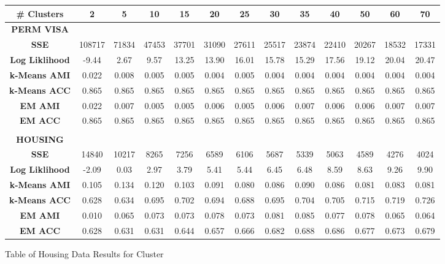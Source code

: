 \documentclass[h]{article}
\begin{document}
\begin{figure}[H] 
\begin{tabular}{ | c | c  | c | c | c | c | c | c| c| c| c| c| c | } 
\hline
\textbf{ # Clusters } & \textbf{2} & \textbf{5} & \textbf{10} & \textbf{15} & \textbf{20} & \textbf{25} & \textbf{30} & \textbf{35} & \textbf{40} & \textbf{50} & \textbf{60} & \textbf{70}   \\
\hline
\textbf{PERM VISA} \\ \hline
\textbf{SSE} &  108717 & 71834 & 47453 & 37701 & 31090 & 27611 & 25517 & 23874 & 22410 & 20267 & 18532 & 17331 \\ \hline
\textbf{Log Liklihood} & -9.44 & 2.67 & 9.57 & 13.25 & 13.90 & 16.01 & 15.78 & 15.29 & 17.56 & 19.12 & 20.04 & 20.47 \\ \hline
\textbf{k-Means AMI} & 0.022 & 0.008 & 0.005 & 0.005 & 0.004 & 0.005 & 0.004 & 0.004 & 0.004 & 0.004 & 0.004 & 0.004 \\ \hline
\textbf{k-Means ACC} & 0.865 & 0.865 & 0.865 & 0.865 & 0.865 & 0.865 & 0.865 & 0.865 & 0.865 & 0.865 & 0.865 & 0.865 \\ \hline
\textbf{EM AMI} & 0.022 & 0.007 & 0.005 & 0.005 & 0.006 & 0.005 & 0.006 & 0.007 & 0.006 & 0.006 & 0.007 & 0.007 \\ \hline
\textbf{EM ACC} & 0.865 & 0.865 & 0.865 & 0.865 & 0.865 & 0.865 & 0.865 & 0.865 & 0.865 & 0.865 & 0.865 & 0.865 \\ \hline
\\
\textbf{HOUSING} \\ \hline
\textbf{SSE} & 14840 & 10217 & 8265 & 7256 & 6589 & 6106 & 5687 & 5339 & 5063 & 4589 & 4276 & 4024 \\ \hline
\textbf{Log Liklihood} & -2.09 & 0.03 & 2.97 & 3.79 & 5.41 & 5.44 & 6.45 & 6.48 & 8.59 & 8.63 & 9.26 & 9.90 \\ \hline
\textbf{k-Means AMI} & 0.105 & 0.134 & 0.120 & 0.103 & 0.091 & 0.080 & 0.086 & 0.090 & 0.086 & 0.081 & 0.083 & 0.081 \\ \hline
\textbf{k-Means ACC} & 0.628 & 0.634 & 0.695 & 0.702 & 0.694 & 0.688 & 0.695 & 0.704 & 0.705 & 0.715 & 0.719 & 0.726 \\ \hline
\textbf{EM AMI} & 0.010 & 0.065 & 0.073 & 0.073 & 0.078 & 0.073 & 0.081 & 0.085 & 0.077 & 0.078 & 0.065 & 0.064 \\ \hline
\textbf{EM ACC} & 0.628 & 0.631 & 0.631 & 0.644 & 0.657 & 0.666 & 0.682 & 0.688 & 0.686 & 0.677 & 0.673 & 0.679 \\ \hline
\end{tabular}
\caption*{Table of Housing Data Results for Cluster } 
\end{figure}
\end{document}
